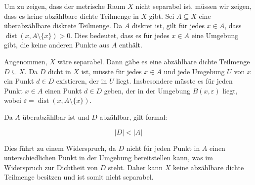 Um zu zeigen, dass der metrische Raum \(X\) nicht separabel ist, müssen wir zeigen, dass es keine abzählbare dichte Teilmenge in \(X\) gibt. Sei \(A \subseteq X\) eine überabzählbare diskrete Teilmenge. Da \(A\) diskret ist, gilt für jedes \(x \in A\), dass \(\operatorname{dist}(x, A \setminus \{x\}) > 0\). Dies bedeutet, dass es für jedes \(x \in A\) eine Umgebung gibt, die keine anderen Punkte aus \(A\) enthält.

Angenommen, \(X\) wäre separabel. Dann gäbe es eine abzählbare dichte Teilmenge \(D \subseteq X\). Da \(D\) dicht in \(X\) ist, müsste für jedes \(x \in A\) und jede Umgebung \(U\) von \(x\) ein Punkt \(d \in D\) existieren, der in \(U\) liegt. Insbesondere müsste es für jeden Punkt \(x \in A\) einen Punkt \(d \in D\) geben, der in der Umgebung \(B(x, \varepsilon)\) liegt, wobei \(\varepsilon = \operatorname{dist}(x, A \setminus \{x\})\).

Da \(A\) überabzählbar ist und \(D\) abzählbar, gilt formal:

\[
|D| < |A|
\]

Dies führt zu einem Widerspruch, da \(D\) nicht für jeden Punkt in \(A\) einen unterschiedlichen Punkt in der Umgebung bereitstellen kann, was im Widerspruch zur Dichtheit von \(D\) steht. Daher kann \(X\) keine abzählbare dichte Teilmenge besitzen und ist somit nicht separabel.

